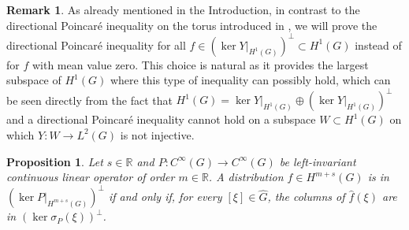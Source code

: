 \documentclass[11pt]{amsart}
\numberwithin{theorem}{section}
\numberwithin{equation}{section}
\newtheorem{prop}[theorem]{Proposition}
\theoremstyle{definition}
\numberwithin{example}{section}
\theoremstyle{definition}
\newtheorem{obs}{Remark}
\theoremstyle{definition}
\newcommand{\R}{\mathbb{R}}
\begin{document}
\begin{obs}\label{remark_perp}
    As already mentioned in the Introduction, in contrast to the directional Poincaré inequality on the torus introduced in  \cite{directional_Poincare}, we will prove the directional Poincaré inequality for all $f\in  (\ker Y|_{H^1(G)})^\perp\subset H^1(G)$ instead of for $f$ with mean value zero.  This choice is natural as it provides the largest subspace of $H^1(G)$ where this type of inequality can possibly hold, which can be seen directly from the fact that $H^1(G)=\ker Y|_{H^1(G)}\oplus(\ker Y|_{H^1(G)})^\perp$ and a directional Poincaré inequality cannot hold on a subspace $W\subset H^1(G)$ on which $Y:W\to L^2(G)$ is not injective.     
\end{obs} 


\begin{prop}\label{prop_EP_equiv_Fourier}
    Let $s\in\R$ and $P:C^\infty(G)\to C^\infty(G)$ be left-invariant continuous linear operator of order $m\in\R$. A distribution $f\in H^{m+s}(G)$ is in  $(\ker P|_{H^{m+s}(G)})^\perp$ if and only if, for every $[\xi]\in\widehat{G}$, the columns of $\widehat{f}(\xi)$ are in $(\ker \sigma_P(\xi))^\perp$.
\end{prop}
\end{document}
